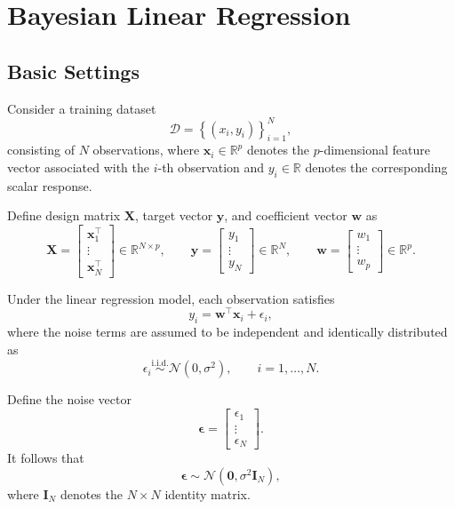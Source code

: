 \documentclass[../Bayesian_Inference.tex]{subfiles}
\begin{document}
\chapter{Bayesian Linear Regression}

\section{Basic Settings}

Consider a training dataset 
\[
    \mathcal{D} = \left\{(x_i,y_i)\right\}_{i=1}^{N},
\]
consisting of $N$ observations, where $\bm{x}_i \in \mathbb{R}^{p}$ denotes the $p$-dimensional feature vector associated with the $i$-th observation and $y_i \in \mathbb{R}$ denotes the corresponding scalar response. 

Define design matrix $\mathbf{X}$, target vector $\bm{y}$, and coefficient vector $\bm{w}$ as 
\[
    \mathbf{X} = \begin{bmatrix}
        \bm{x}_1^{\top} \\
        \vdots \\
        \bm{x}_N^{\top}
    \end{bmatrix} \in \mathbb{R}^{N \times p}, \qquad
    \bm{y} = \begin{bmatrix}
        {y}_1 \\
        \vdots \\
        {y}_N
    \end{bmatrix} \in \mathbb{R}^{N}, \qquad
    \bm{w} = \begin{bmatrix}
        {w}_1 \\
        \vdots \\
        {w}_p
    \end{bmatrix} \in \mathbb{R}^{p}.
\]

Under the linear regression model, each observation satisfies
\[
    y_i = \bm{w}^{\top} \bm{x}_i + \epsilon_i,
\]
where the noise terms are assumed to be independent and identically distributed as
\[
    \epsilon_i \overset{\mathrm{i.i.d.}}{\sim}\mathcal N(0,\sigma^2), \qquad i=1,\dots,N.
\]

Define the noise vector
\[
    \bm{\epsilon} = \begin{bmatrix}
        \epsilon_1 \\
        \vdots \\
        \epsilon_N
    \end{bmatrix}.
\]
It follows that
\[
    \bm\epsilon \sim \mathcal N(\bm 0,\sigma^2\mathbf I_N),
\]
where $\mathbf{I}_N$ denotes the $N\times N$ identity matrix.
\end{document}
